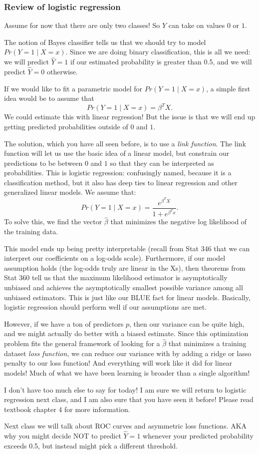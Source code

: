 \subsubsection{Review of logistic regression}

Assume for now that there are only two classes! So $Y$ can take on values $0$ or $1$. 

The notion of Bayes classifier tells us that we should try to model $Pr(Y=1 \mid X=x)$. Since we are doing binary classification, this is all we need: we will predict $\hat{Y}=1$ if our estimated probability is greater than 0.5, and we will predict $\hat{Y}=0$ otherwise. 

If we would like to fit a parametric model for $Pr(Y=1 \mid X=x)$, a simple first idea would be to assume that
$$
Pr(Y=1 \mid X=x) = \beta^T X.
$$
We could estimate this with linear regression! But the issue is that we will end up getting predicted probabilities outside of $0$ and $1$.

The solution, which you have all seen before, is to use a \emph{link function}. The link function will let us use the basic idea of a linear model, but constrain our predictions to be between $0$ and $1$ so that they can be interpreted as probabilities. This is logistic regression: confusingly named, because it is a classification method, but it also has deep ties to linear regression and other generalized linear models. We assume that:
$$
Pr(Y=1 \mid X=x) = \frac{e^{\beta^T X}}{1 + e^{\beta^T x}}.
$$
To solve this, we find the vector $\hat{\beta}$ that minimizes the negative log likelihood of the training data. 

This model ends up being pretty interpretable (recall from Stat 346 that we can interpret our coefficients on a log-odds scale). Furthermore, if our model assumption holds (the log-odds truly are linear in the Xs), then theorems from Stat 360 tell us that the maximum likelihood estimator is asymptotically unbiased and achieves the asymptotically smallest possible variance among all unbiased estimators. This is just like our BLUE fact for linear models. Basically, logistic regression should perform well if our assumptions are met. 

However, if we have a ton of predictors $p$, then our variance can be quite high, and we might actually do better with a biased estimate. Since this optimization problem fits the general framework of looking for a $\hat{\beta}$ that minimizes a training  dataset \emph{loss function}, we can reduce our variance with by adding a ridge or lasso penalty to our loss function! And everything will work like it did for linear models! Much of what we have been learning is broader than a single algorithm! 

I don't have too much else to say for today! I am sure we will return to logistic regression next class, and I am also sure that you have seen it before! Please read textbook chapter 4 for more information.

Next class we will talk about ROC curves and asymmetric loss functions. AKA why you might decide NOT to predict $\hat{Y}=1$ whenever your predicted probability exceeds 0.5, but instead might pick a different threshold.  


